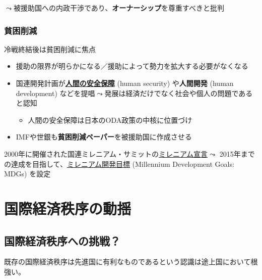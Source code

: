 \documentclass[
  xelatex,
  ja=standard]{bxjsarticle}
\providecommand{\tightlist}{%
  \setlength{\itemsep}{0pt}\setlength{\parskip}{0pt}}\usepackage{longtable,booktabs,array}
\begin{document}
\(\leadsto\)被援助国への内政干渉であり、\textbf{オーナーシップ}を尊重すべきと批判

\hypertarget{ux8ca7ux56f0ux524aux6e1b}{%
\subsubsection{貧困削減}\label{ux8ca7ux56f0ux524aux6e1b}}

冷戦終結後は貧困削減に焦点

\begin{itemize}
\tightlist
\item
  援助の限界が明らかになる／援助によって勢力を拡大する必要がなくなる
\item
  国連開発計画が\href{https://www.mofa.go.jp/mofaj/gaiko/oda/bunya/security/index.html}{\textbf{人間の安全保障}}
  (human security) や\textbf{人間開発} (human development)
  などを提唱\(\leadsto\)発展は経済だけでなく社会や個人の問題であると認知

  \begin{itemize}
  \tightlist
  \item
    人間の安全保障は日本のODA政策の中核に位置づけ
  \end{itemize}
\item
  IMFや世銀も\textbf{貧困削減ペーパー}を被援助国に作成させる
\end{itemize}

2000年に開催された国連ミレニアム・サミットの\href{https://www.mofa.go.jp/mofaj/kaidan/kiroku/s_mori/arc_00/m_summit/sengen.html}{ミレニアム宣言}\(\leadsto\)
2015年までの達成を目指して、\href{https://www.un.org/millenniumgoals/2015_MDG_Report/pdf/MDG\%202015\%20PC\%20final.pdf}{ミレニアム開発目標}
(Millennium Development Goals: MDGs) を設定

\hypertarget{ux56fdux969bux7d4cux6e08ux79e9ux5e8fux306eux52d5ux63fa}{%
\section{国際経済秩序の動揺}\label{ux56fdux969bux7d4cux6e08ux79e9ux5e8fux306eux52d5ux63fa}}

\hypertarget{ux56fdux969bux7d4cux6e08ux79e9ux5e8fux3078ux306eux6311ux6226}{%
\subsection{国際経済秩序への挑戦？}\label{ux56fdux969bux7d4cux6e08ux79e9ux5e8fux3078ux306eux6311ux6226}}

既存の国際経済秩序は先進国に有利なものであるという認識は途上国において根強い。
\end{document}
